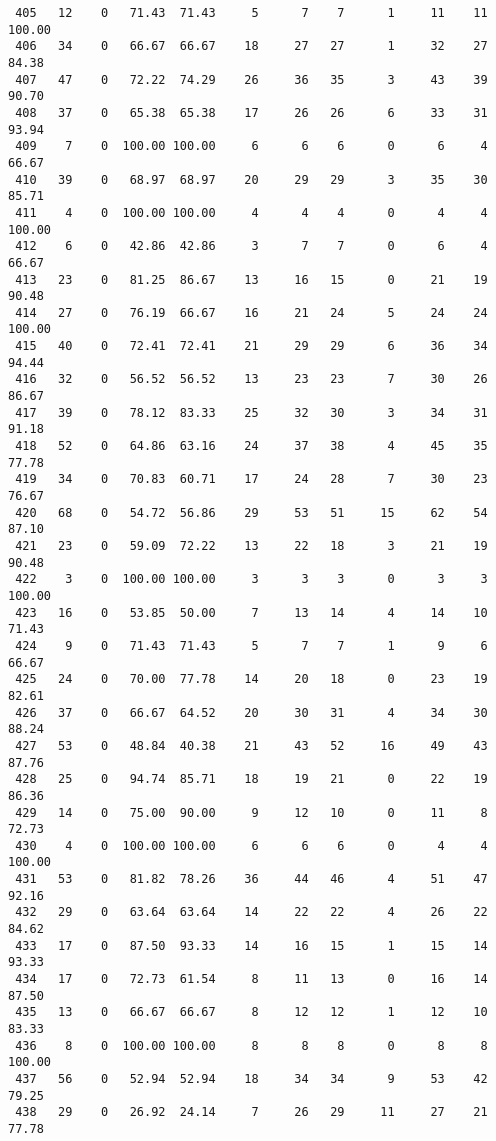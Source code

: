 \begin{verbatim}
 405   12    0   71.43  71.43     5      7    7      1     11    11   100.00
 406   34    0   66.67  66.67    18     27   27      1     32    27    84.38
 407   47    0   72.22  74.29    26     36   35      3     43    39    90.70
 408   37    0   65.38  65.38    17     26   26      6     33    31    93.94
 409    7    0  100.00 100.00     6      6    6      0      6     4    66.67
 410   39    0   68.97  68.97    20     29   29      3     35    30    85.71
 411    4    0  100.00 100.00     4      4    4      0      4     4   100.00
 412    6    0   42.86  42.86     3      7    7      0      6     4    66.67
 413   23    0   81.25  86.67    13     16   15      0     21    19    90.48
 414   27    0   76.19  66.67    16     21   24      5     24    24   100.00
 415   40    0   72.41  72.41    21     29   29      6     36    34    94.44
 416   32    0   56.52  56.52    13     23   23      7     30    26    86.67
 417   39    0   78.12  83.33    25     32   30      3     34    31    91.18
 418   52    0   64.86  63.16    24     37   38      4     45    35    77.78
 419   34    0   70.83  60.71    17     24   28      7     30    23    76.67
 420   68    0   54.72  56.86    29     53   51     15     62    54    87.10
 421   23    0   59.09  72.22    13     22   18      3     21    19    90.48
 422    3    0  100.00 100.00     3      3    3      0      3     3   100.00
 423   16    0   53.85  50.00     7     13   14      4     14    10    71.43
 424    9    0   71.43  71.43     5      7    7      1      9     6    66.67
 425   24    0   70.00  77.78    14     20   18      0     23    19    82.61
 426   37    0   66.67  64.52    20     30   31      4     34    30    88.24
 427   53    0   48.84  40.38    21     43   52     16     49    43    87.76
 428   25    0   94.74  85.71    18     19   21      0     22    19    86.36
 429   14    0   75.00  90.00     9     12   10      0     11     8    72.73
 430    4    0  100.00 100.00     6      6    6      0      4     4   100.00
 431   53    0   81.82  78.26    36     44   46      4     51    47    92.16
 432   29    0   63.64  63.64    14     22   22      4     26    22    84.62
 433   17    0   87.50  93.33    14     16   15      1     15    14    93.33
 434   17    0   72.73  61.54     8     11   13      0     16    14    87.50
 435   13    0   66.67  66.67     8     12   12      1     12    10    83.33
 436    8    0  100.00 100.00     8      8    8      0      8     8   100.00
 437   56    0   52.94  52.94    18     34   34      9     53    42    79.25
 438   29    0   26.92  24.14     7     26   29     11     27    21    77.78

\end{verbatim}
